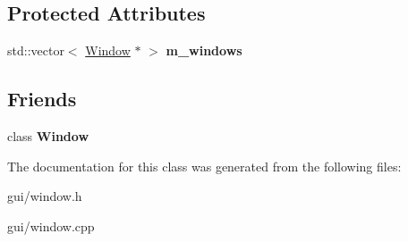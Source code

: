 \subsection*{Protected Attributes}
\begin{DoxyCompactItemize}
\item 
std\+::vector$<$ \hyperlink{classWindow}{Window} $\ast$ $>$ {\bfseries m\+\_\+windows}\hypertarget{classWindowManager_ac94ee582e7872f352e2f0825f1f56dfc}{}\label{classWindowManager_ac94ee582e7872f352e2f0825f1f56dfc}

\end{DoxyCompactItemize}
\subsection*{Friends}
\begin{DoxyCompactItemize}
\item 
class {\bfseries Window}\hypertarget{classWindowManager_a553f958a25683445088050a69d3de8e9}{}\label{classWindowManager_a553f958a25683445088050a69d3de8e9}

\end{DoxyCompactItemize}


The documentation for this class was generated from the following files\+:\begin{DoxyCompactItemize}
\item 
gui/window.\+h\item 
gui/window.\+cpp\end{DoxyCompactItemize}

